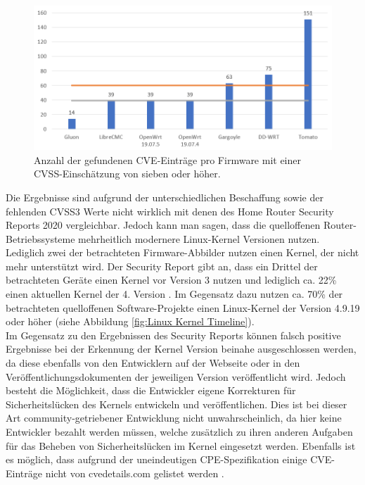 \documentclass[a4paper]{book}
\begin{document}
\begin{large}
\begin{onehalfspace}
\begin{figure}[ht]
\begin{center}
\includegraphics[scale=0.5]{images/number_of_cves} 
\caption{Anzahl der gefundenen CVE-Einträge pro Firmware mit einer CVSS-Einschätzung von sieben oder höher.}
\label{fig:Firmware CVE Numbers}
\end{center}
\end{figure}

Die Ergebnisse sind aufgrund der unterschiedlichen Beschaffung sowie der fehlenden CVSS3 Werte nicht wirklich mit denen des \glqq Home Router Security Reports 2020\grqq{} vergleichbar. Jedoch kann man sagen, dass die quelloffenen Router-Betriebssysteme mehrheitlich modernere Linux-Kernel Versionen nutzen. Lediglich zwei der betrachteten Firmware-Abbilder nutzen einen Kernel, der nicht mehr unterstützt wird. Der \glqq Security Report\grqq{} gibt an, dass ein Drittel der betrachteten Geräte einen Kernel vor Version 3 nutzen und lediglich ca. 22\% einen aktuellen Kernel der 4. Version \cite[p.~8]{PeterWeidenbachJohannesvomDorp.2020}. Im Gegensatz dazu nutzen ca. 70\% der betrachteten quelloffenen Software-Projekte einen Linux-Kernel der Version 4.9.19 oder höher (siehe Abbildung \ref{fig:Linux Kernel Timeline}). \\ \indent
Im Gegensatz zu den Ergebnissen des \glqq Security Reports\grqq{} können falsch positive Ergebnisse bei der Erkennung der Kernel Version beinahe ausgeschlossen werden, da diese ebenfalls von den Entwicklern auf der Webseite oder in den Veröffentlichungsdokumenten der jeweiligen Version veröffentlicht wird. Jedoch besteht die Möglichkeit, dass die Entwickler eigene Korrekturen für Sicherheitslücken des Kernels entwickeln und veröffentlichen. Dies ist bei dieser Art community-getriebener Entwicklung nicht unwahrscheinlich, da hier keine Entwickler bezahlt werden müssen, welche zusätzlich zu ihren anderen Aufgaben für das Beheben von Sicherheitslücken im Kernel eingesetzt werden. Ebenfalls ist es möglich, dass aufgrund der uneindeutigen CPE-Spezifikation einige CVE-Einträge nicht von \mbox \glqq cvedetails.com\grqq{} gelistet werden \cite[p.~7]{PeterWeidenbachJohannesvomDorp.2020}.	


\end{onehalfspace}
\end{large}
\end{document}
